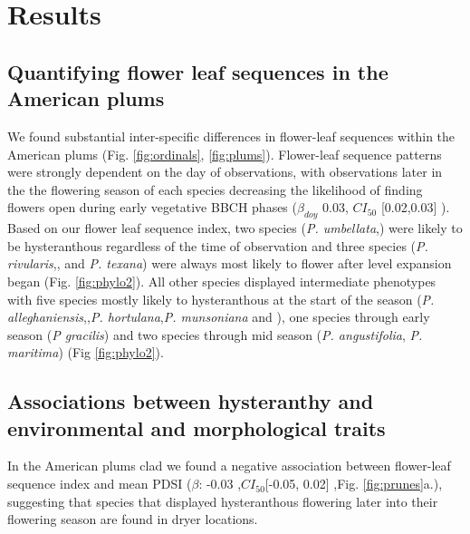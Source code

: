 \documentclass{article}[11pt]
\begin{document}


\section*{Results}
\subsection*{Quantifying flower leaf sequences in the American plums}
We found substantial inter-specific differences in flower-leaf sequences within the American plums (Fig. \ref{fig:ordinals}, \ref{fig:plums}). %
Flower-leaf sequence patterns were strongly dependent on the day of observations, with observations later in the the flowering season of each species decreasing the likelihood of finding flowers open during early vegetative BBCH phases ($\beta_{doy}$ 0.03, $CI_{50}$ [0.02,0.03] ). Based on our flower leaf sequence index, two species (\textit{P. umbellata},) were likely to be hysteranthous regardless of the time of observation and three species (\textit{P. rivularis},, and \textit{P. texana}) were always most likely to flower after level expansion began (Fig. \ref{fig:phylo2}). All other species displayed intermediate phenotypes with five species mostly likely to hysteranthous at the start of the season (\textit{P. alleghaniensis},,\textit{P. hortulana},\textit{P. munsoniana} and ), one species through early season (\textit{P gracilis}) and two species through mid season (\textit{P. angustifolia}, \textit{P. maritima}) (Fig \ref{fig:phylo2}).

\subsection*{Associations between hysteranthy and environmental and morphological traits}
In the American plums clad we found a negative association between flower-leaf sequence index and mean PDSI ($\beta$: -0.03 ,$CI_{50}$[-0.05,  0.02] ,Fig. \ref{fig:prunes}a.), suggesting that species that displayed hysteranthous flowering later into their flowering season are found in dryer locations. 
\end{document}
